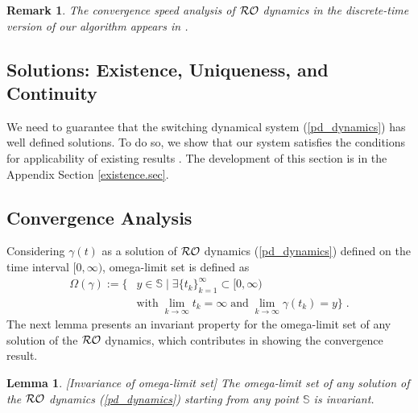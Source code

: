 \documentclass[journal,twoside,web]{ieeecolor}
\newtheorem{lemma}{Lemma}
\newtheorem{remark}{Remark}
\begin{document}
\begin{remark} \label{convergence_speed}
The convergence speed analysis of ${\cal RO}$ dynamics in the discrete-time version of our algorithm appears in \cite{ebrahimi2019cdc}.
\end{remark}

\subsection{Solutions: Existence, Uniqueness, and Continuity}
We need to guarantee that the switching dynamical system (\ref{pd_dynamics}) has well defined solutions.
To do so, we show that our system satisfies the conditions for applicability of existing results \cite{cherukuri2016}. The development of this section is in the Appendix Section \ref{existence.sec}.

\subsection{Convergence Analysis}
Considering $\gamma(t)$ as a solution of ${\cal RO}$ dynamics (\ref{pd_dynamics}) defined on the time interval $[0,\infty)$, omega-limit set is defined as
\begin{align} \label{omega_limit}
\Omega(\gamma):=\{& y \in \mathbb S \;|\; \exists \{t_k\}_{k=1}^\infty \subset [0,\infty) \nonumber\\
&\text{with}\; \lim_{k \rightarrow \infty} t_k=\infty \;\text{and}\; \lim_{k \rightarrow \infty} \gamma(t_k)=y\}\;.
\end{align}
The next lemma presents an invariant property for the omega-limit set of any solution of the ${\cal RO}$ dynamics, which contributes in showing the convergence result.
\begin{lemma}\cite[Lemma~4.4]{cherukuri2016}[Invariance of omega-limit set]
The omega-limit set of any solution of the ${\cal RO}$ dynamics (\ref{pd_dynamics}) starting from any point $\mathbb S$ is invariant.
\label{omega_invariance}
\end{lemma}
\end{document}
